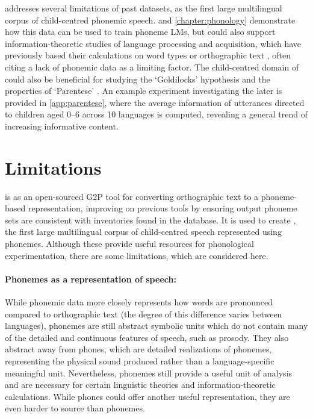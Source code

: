 \ipachildes addresses several limitations of past datasets, as the first large multilingual corpus of child-centred phonemic speech.  and \cref{chapter:phonology} demonstrate how this data can be used to train phoneme LMs, but \ipachildes could also support information-theoretic studies of language processing and acquisition, which have previously based their calculations on word types \citep{piantadosi2011word, dautriche2017words, pimentel2020phonotactic} or orthographic text \citep{mahowald2013info, dautriche2017wordform, futrell2020lossy}, often citing a lack of phonemic data as a limiting factor. The child-centred domain of \ipachildes could also be beneficial for studying the `Goldilocks' hypothesis \citep{kidd2014goldilocks} and the properties of `Parentese' \citep{ramirez2017look}. An example experiment investigating the later is provided in \cref{app:parentese}, where the average information of utterances directed to children aged 0--6 across 10 languages is computed, revealing a general trend of increasing informative content.

\section{Limitations}\label{sec:13-limitations}


\gpp is as an open-sourced G2P tool for converting orthographic text to a phoneme-based representation, improving on previous tools by ensuring output phoneme sets are consistent with inventories found in the \phoible database. It is used to create \ipachildes, the first large multilingual corpus of child-centred speech represented using phonemes. Although these provide useful resources for phonological experimentation, there are some limitations, which are considered here.

\paragraph{Phonemes as a representation of speech:} While phonemic data more closely represents how words are pronounced compared to orthographic text (the degree of this difference varies between languages), phonemes are still abstract symbolic units which do not contain many of the detailed and continuous features of speech, such as prosody. They also abstract away from phones, which are detailed realizations of phonemes, representing the physical sound produced rather than a language-specific meaningful unit. Nevertheless, phonemes still provide a useful unit of analysis and are necessary for certain linguistic theories and information-theoretic calculations. While phones could offer another useful representation, they are even harder to source than phonemes.

